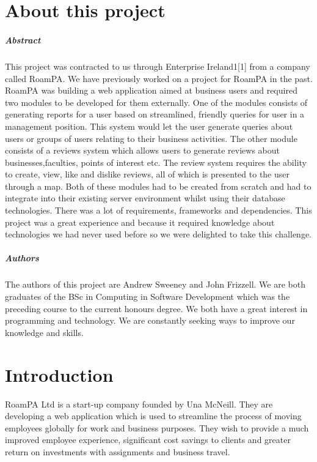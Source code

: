 
\chapter*{About this project}
\paragraph{Abstract}

This project was contracted to us through Enterprise Ireland1[1] from a company called RoamPA. We have previously worked on a project for RoamPA in the past. RoamPA was building a web application aimed at business users and required two modules to be developed for them externally. One of the modules consists of generating reports for a user based on streamlined, friendly queries for user in a management position. This system would let the user generate queries about users or groups of users relating to their business activities. The other module consists of a reviews system which allows users to generate reviews about businesses,faculties, points of interest etc. The review system requires the ability to create, view, like and dislike reviews, all of which is presented to the user through a map. Both of these modules had to be created from scratch and had to integrate into their existing server environment whilst using their database technologies. There was a lot of requirements, frameworks and dependencies. This project was a great experience and because it required knowledge about technologies we had never used before so we were delighted to take this challenge.

\paragraph{Authors}

The authors of this project are Andrew Sweeney and John Frizzell. We are both graduates of the BSc in Computing in Software Development which was the preceding course to the current honours degree. We both have a great interest in programming and technology. We are constantly seeking ways to improve our knowledge and skills.


\chapter{Introduction}

RoamPA Ltd is a start-up company founded by Una McNeill. They are developing a web application which is used to streamline the process of moving employees globally for work and business purposes. They wish to provide a much improved employee experience, significant cost savings to clients and greater return on investments with assignments and business travel.

